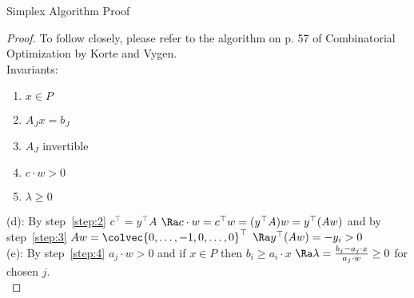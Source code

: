 \documentclass[a4paper, x11names, svgnames]{beamer}
\theoremstyle{definition}
\theoremstyle{plain}
\theoremstyle{plain}
\begin{document}
\begin{frame}{Simplex Algorithm Proof}
    \begin{proof}
        To follow closely, please refer to the algorithm on p. 57 of Combinatorial Optimization by Korte and Vygen. \\ %
        Invariants:
        \renewcommand{\theenumi}{(\alph{enumi})}
        \begin{multicols}{3}
        \begin{enumerate}  %
            \item $x \in P$
            \item $A_J x = b_J$
            \item $A_J$ invertible
            \item $c\cdot w > 0$
            \item $\lambda \geq 0$
        \end{enumerate}
        \end{multicols}

        (d): By step~\ref{step:2} $c^\top=y^\top A$
        $\Ra c\cdot w = c^\top w = (y^\top A)w = y^\top (Aw)$
        and by step~\ref{step:3} $A w = \colvec{0,\dots,-1,0,\dots,0}^\top$ \pause
        $\Ra y^\top (Aw) = -y_i > 0$ \pause  \\
        (e): By step~\ref{step:4} $a_j\cdot w > 0$ and if $x\in P$ then $b_i \geq a_i\cdot x$ \pause
        $\Ra \lambda = \frac{b_j-a_j\cdot x}{a_j\cdot w} \geq 0$ for chosen $j$. \\
    \end{proof}  %
\end{frame}
\end{document}
